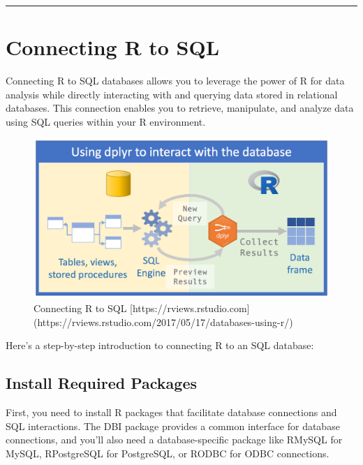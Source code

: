 \documentclass[
]{book}
\begin{document}
\begin{center}\rule{0.5\linewidth}{0.5pt}\end{center}

\hypertarget{connecting-r-to-sql-1}{%
\section{Connecting R to SQL}\label{connecting-r-to-sql-1}}

Connecting R to SQL databases allows you to leverage the power of R for data analysis while directly interacting with and querying data stored in relational databases. This connection enables you to retrieve, manipulate, and analyze data using SQL queries within your R environment.

\begin{figure}

{\centering \includegraphics[width=1\linewidth]{./images/Bab2/coneccting_db_in_R} 

}

\caption{Connecting R to SQL [https://rviews.rstudio.com](https://rviews.rstudio.com/2017/05/17/databases-using-r/)}\label{fig:coneccting}
\end{figure}

Here's a step-by-step introduction to connecting R to an SQL database:

\hypertarget{install-required-packages}{%
\subsection{Install Required Packages}\label{install-required-packages}}

First, you need to install R packages that facilitate database connections and SQL interactions. The DBI package provides a common interface for database connections, and you'll also need a database-specific package like RMySQL for MySQL, RPostgreSQL for PostgreSQL, or RODBC for ODBC connections.
\end{document}
